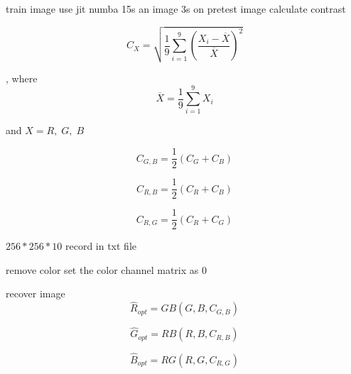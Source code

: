 \documentclass[11pt]{scrartcl} %
\begin{document}
train image
use jit numba
15s an image
3s on pretest image
calculate contrast

\begin{equation}
C_X=\sqrt{\frac19\sum_{i=1}^9{(\frac{X_i-\overline X}{\overline X})}^2}
\label{contrast}
\end{equation}




, where
\begin{equation}
\overline X=\frac19\sum_{i=1}^9X_i
\label{mean}
\end{equation}

and $X=R,\;G,\;B$

\begin{equation}
C_{G,B}=\frac12(C_G+C_B)
\label{contrast_GB}
\end{equation}

\begin{equation}
C_{R,B}=\frac12(C_R+C_B)
\label{contrast_RB}
\end{equation}

\begin{equation}
C_{R,G}=\frac12(C_R+C_G)
\label{contrast_RG}
\end{equation}

$256*256*10$
record in txt file

remove color
set the color channel matrix as 0

recover image
\begin{equation}
{\widehat R}_{opt}=GB(G,B,C_{G,B})
\end{equation}

\begin{equation}
{\widehat G}_{opt}=RB(R,B,C_{R,B})
\end{equation}

\begin{equation}
{\widehat B}_{opt}=RG(R,G,C_{R,G})
\end{equation}
\end{document}
